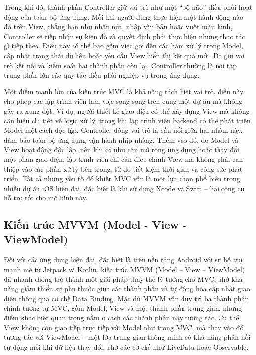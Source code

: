     \begin{flushleft}
      \hspace*{0.8cm}Trong khi đó, thành phần Controller giữ vai trò như một “bộ não” điều phối hoạt động của toàn bộ ứng dụng. Mỗi khi người dùng thực hiện một hành động nào đó trên View, chẳng hạn như nhấn nút, nhập văn bản hoặc vuốt màn hình, Controller sẽ tiếp nhận sự kiện đó và quyết định phải thực hiện những thao tác gì tiếp theo. Điều này có thể bao gồm việc gọi đến các hàm xử lý trong Model, cập nhật trạng thái dữ liệu hoặc yêu cầu View hiển thị kết quả mới. Do giữ vai trò kết nối và kiểm soát hai thành phần còn lại, Controller thường là nơi tập trung phần lớn các quy tắc điều phối nghiệp vụ trong ứng dụng.
    \end{flushleft}

    \begin{flushleft}
      \hspace*{0.8cm}Một điểm mạnh lớn của kiến trúc MVC là khả năng tách biệt vai trò, điều này cho phép các lập trình viên làm việc song song trên cùng một dự án mà không gây ra xung đột. Ví dụ, người thiết kế giao diện có thể xây dựng View mà không cần hiểu chi tiết về logic xử lý, trong khi lập trình viên backend có thể phát triển Model một cách độc lập. Controller đóng vai trò là cầu nối giữa hai nhóm này, đảm bảo toàn bộ ứng dụng vận hành nhịp nhàng. Thêm vào đó, do Model và View hoạt động độc lập, nên khi có nhu cầu mở rộng ứng dụng hoặc thay đổi một phần giao diện, lập trình viên chỉ cần điều chỉnh View mà không phải can thiệp vào các phần xử lý bên trong, từ đó tiết kiệm thời gian và công sức phát triển. Tất cả những yếu tố đó khiến MVC vẫn là một lựa chọn phổ biến trong nhiều dự án iOS hiện đại, đặc biệt là khi sử dụng Xcode và Swift – hai công cụ hỗ trợ tốt cho mô hình này.
    \end{flushleft}

\subsection{Kiến trúc MVVM (Model - View - ViewModel)}
\renewcommand{\labelitemi}{--}    
    \begin{flushleft}
        \hspace*{0.8cm}Đối với các ứng dụng hiện đại, đặc biệt là trên nền tảng Android với sự hỗ trợ mạnh mẽ từ Jetpack và Kotlin, kiến trúc MVVM (Model – View – ViewModel) đã nhanh chóng trở thành một giải pháp thay thế lý tưởng cho MVC, nhờ khả năng giảm thiểu sự phụ thuộc giữa các thành phần và tự động hóa cập nhật giao diện thông qua cơ chế Data Binding. Mặc dù MVVM vẫn duy trì ba thành phần chính tương tự MVC, gồm Model, View và một thành phần trung gian, nhưng điểm khác biệt quan trọng nằm ở cách các thành phần này tương tác. Cụ thể, View không còn giao tiếp trực tiếp với Model như trong MVC, mà thay vào đó tương tác với ViewModel – một lớp trung gian thông minh có khả năng phản hồi tự động mỗi khi dữ liệu thay đổi, nhờ các cơ chế như LiveData hoặc Observable.
    \end{flushleft}

